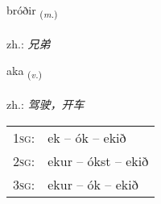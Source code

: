 \documentclass[frontgrid, backgrid]{flacards}\usepackage[]{graphicx}\usepackage[]{xcolor}
\begin{document}
\renewcommand{\blhead}{\vskip5pt {\small\bfseries\footnotesize Nafnorð | 名词 }}
\renewcommand{\bcfoot}{\vskip5pt \hspace{2pt}{\small\bfseries\footnotesize 1K}}


{bróðir \small{\textsubscript{(\textit{m.})}} \\[1ex] %
\textphonetic{[prouːðɪr]} \\
zh.: \emph{兄弟} \\  [2ex]
\renewcommand*{\arraystretch}{0.8}
}

\renewcommand{\flhead}{\vskip5pt \fboxsep=0pt {\small\bfseries\footnotesize Sagnorð | 动词}}
\renewcommand{\fcfoot}{\vskip5pt \fboxsep=0pt \hspace{2pt}{\small\bfseries\footnotesize 1K}}

\renewcommand{\blhead}{\vskip5pt {\small\bfseries\footnotesize Sagnorð | 动词 }}
\renewcommand{\bcfoot}{\vskip5pt \hspace{2pt}{\small\bfseries\footnotesize 1K}}


{aka \small{\textsubscript{(\textit{v.})}} \\[1ex] %
\textphonetic{[aːka]} \\
zh.: \emph{驾驶，开车} \\  [2ex]
\renewcommand*{\arraystretch}{0.8}
\begin{tabular}{p{1cm}l}
\textsc{1sg}: & ek -- ók -- ekið \\ 
\textsc{2sg}: & ekur -- ókst -- ekið \\ 
\textsc{3sg}: & ekur -- ók -- ekið \\ 
\end{tabular}
}

\renewcommand{\flhead}{\vskip5pt \fboxsep=0pt {\small\bfseries\footnotesize Sagnorð | 动词}}
\renewcommand{\fcfoot}{\vskip5pt \fboxsep=0pt \hspace{2pt}{\small\bfseries\footnotesize 1K}}
\end{document}
